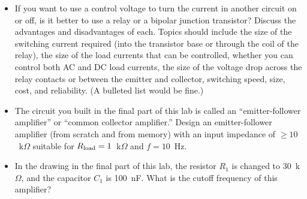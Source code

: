\begin{itemize}

\item If you want to use a control voltage to turn the current in another circuit on or off, is it better to use a relay or a bipolar junction transistor?  Discuss the advantages and disadvantages of each.  Topics should include the size of the switching current required (into the transistor base or through the coil of the relay), the size of the load currents that can be controlled, whether you can control both AC and DC load currents, the size of the voltage drop across the relay contacts or between the emitter and collector, switching speed, size, cost, and reliability.  (A bulleted list would be fine.)

\item The circuit you built in the final part of this lab is called an ``emitter-follower amplifier'' or ``common collector amplifier.''  Design an emitter-follower amplifier (from scratch and from memory) with an input impedance of $\ge 10$~k$\Omega$ suitable for $R_{\rm load}=1$~k$\Omega$ and $f=10$~Hz.

\item In the drawing in the final part of this lab, the resistor $R_1$ is changed to 30~k$\Omega$, and the capacitor $C_1$ is 100~nF.  What is the cutoff frequency of this amplifier?

\end{itemize}








